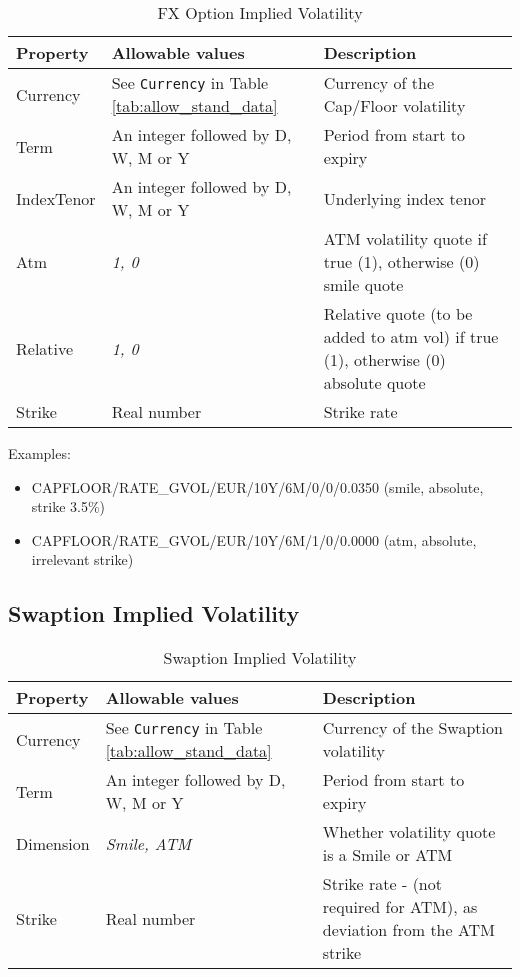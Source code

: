 \begin{table}[H]
\centering
\begin{tabular}{|p{3cm}|p{3.5cm}|p{7cm}|}
\hline
{\bf Property} & {\bf Allowable values} & {\bf Description} \\
\hline
Currency & See \lstinline!Currency! in Table \ref{tab:allow_stand_data}&  Currency of the Cap/Floor volatility\\ \hline
Term & An integer followed by D, W, M or Y & Period from start to expiry \\ \hline
IndexTenor & An integer followed by D, W, M or Y & Underlying index tenor \\ \hline
Atm & \emph{1, 0} & ATM volatility quote if true (1), otherwise (0) smile quote\\ \hline
Relative & \emph{1, 0} & Relative quote (to be added to atm vol) if true (1), otherwise (0) absolute quote\\ \hline
Strike & Real number & Strike rate\\ 
\hline
\end{tabular}
  \caption{FX Option Implied Volatility}
  \label{tab:fximplvol_quote}
\end{table}


\medskip
Examples: 
\begin{itemize}
\item {CAPFLOOR/RATE\_GVOL/EUR/10Y/6M/0/0/0.0350} (smile, absolute, strike 3.5\%)
\item {CAPFLOOR/RATE\_GVOL/EUR/10Y/6M/1/0/0.0000} (atm, absolute, irrelevant strike)
\end{itemize}

\subsection{Swaption Implied Volatility}

\begin{table}[H]
\centering
\begin{tabular}{|p{3cm}|p{3.5cm}|p{7cm}|}
\hline
{\bf Property} & {\bf Allowable values} & {\bf Description} \\
\hline
Currency & See \lstinline!Currency! in Table \ref{tab:allow_stand_data}&  Currency of the Swaption volatility\\ \hline
Term & An integer followed by D, W, M or Y & Period from start to expiry \\ \hline
Dimension & \emph{Smile, ATM}  & Whether volatility quote is a Smile or ATM \\ \hline
Strike & Real number & Strike rate - (not required for ATM), as deviation from the ATM strike\\ 
\hline
\end{tabular}
  \caption{Swaption Implied Volatility}
  \label{tab:swaptimplvol_quote}
\end{table}



